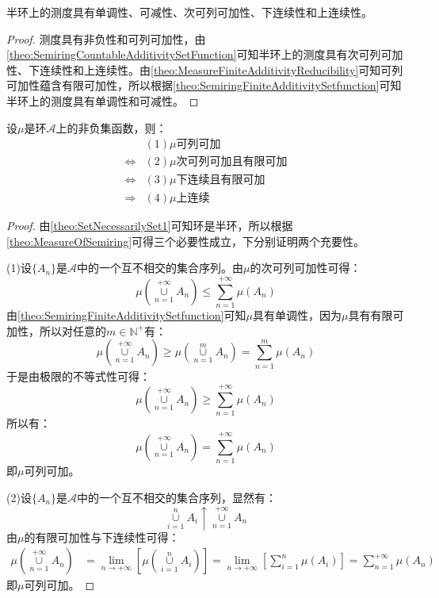 \begin{theorem}\label{theo:MeasureOfSemiring}
	半环上的测度具有单调性、可减性、次可列可加性、下连续性和上连续性。
\end{theorem}
\begin{proof}
	测度具有非负性和可列可加性，由\cref{theo:SemiringCountableAdditivitySetFunction}可知半环上的测度具有次可列可加性、下连续性和上连续性。由\cref{theo:MeasureFiniteAdditivityReducibility}可知可列可加性蕴含有限可加性，所以根据\cref{theo:SemiringFiniteAdditivitySetfunction}可知半环上的测度具有单调性和可减性。
\end{proof}
\begin{theorem}
	设$\mu$是环$\mathscr{A}$上的非负集函数，则：
	\begin{align*}
		&(1)\mu\text{可列可加} \\
		\Leftrightarrow&(2)\mu\text{次可列可加且有限可加} \\
		\Leftrightarrow&(3)\mu\text{下连续且有限可加} \\
		\Rightarrow&(4)\mu\text{上连续}
	\end{align*}
\end{theorem}
\begin{proof}
	由\cref{theo:SetNecessarilySet1}可知环是半环，所以根据\cref{theo:MeasureOfSemiring}可得三个必要性成立，下分别证明两个充要性。\par
	(1)设$\{A_n\}$是$\mathscr{A}$中的一个互不相交的集合序列。由$\mu$的次可列可加性可得：
	\begin{equation*}
		\mu\left(\underset{n=1}{\overset{+\infty}{\cup}}A_n\right)\leqslant
		\sum_{n=1}^{+\infty}\mu(A_n)
	\end{equation*}
	由\cref{theo:SemiringFiniteAdditivitySetfunction}可知$\mu$具有单调性，因为$\mu$具有有限可加性，所以对任意的$m\in\mathbb{N}^+$有：
	\begin{equation*}
		\mu\left(\underset{n=1}{\overset{+\infty}{\cup}}A_n\right)\geqslant\mu\left(\underset{n=1}{\overset{m}{\cup}}A_n\right)=\sum_{n=1}^{m}\mu(A_n)
	\end{equation*}
	于是由极限的不等式性可得：
	\begin{equation*}
		\mu\left(\underset{n=1}{\overset{+\infty}{\cup}}A_n\right)\geqslant
		\sum_{n=1}^{+\infty}\mu(A_n)
	\end{equation*}
	所以有：
	\begin{equation*}
		\mu\left(\underset{n=1}{\overset{+\infty}{\cup}}A_n\right)=\sum_{n=1}^{+\infty}\mu(A_n)
	\end{equation*}
	即$\mu$可列可加。\par
	(2)设$\{A_n\}$是$\mathscr{A}$中的一个互不相交的集合序列，显然有：
	\begin{equation*}
		\underset{i=1}{\overset{n}{\cup}}A_i\uparrow\underset{n=1}{\overset{+\infty}{\cup}}A_n
	\end{equation*}
	由$\mu$的有限可加性与下连续性可得：
	\begin{align*}
		\mu\left(\underset{n=1}{\overset{+\infty}{\cup}}A_n\right)
		&=\lim_{n\to+\infty}\left[\mu\left(\underset{i=1}{\overset{n}{\cup}}A_i\right)\right] =\lim_{n\to+\infty}\left[\sum_{i=1}^{n}\mu(A_i)\right]=\sum_{n=1}^{+\infty}\mu(A_n)
	\end{align*}
	即$\mu$可列可加。
\end{proof}

